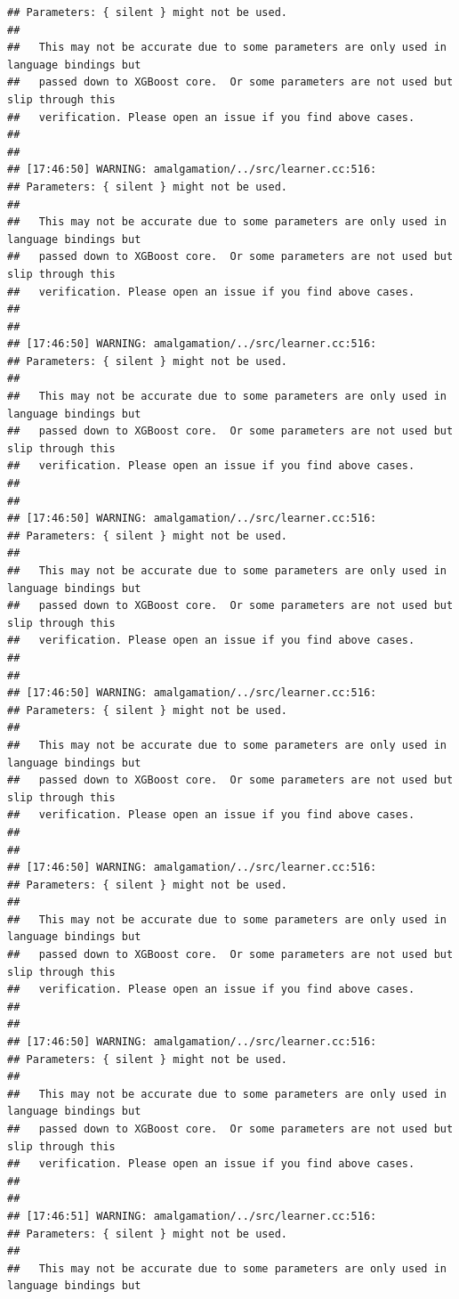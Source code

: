 \documentclass[AMS,STIX2COL]{WileyNJD-v2}\usepackage[]{graphicx}\usepackage[]{color}
\makeatletter
\newenvironment{kframe}{%
 \def\at@end@of@kframe{}%
 \ifinner\ifhmode%
  \def\at@end@of@kframe{\end{minipage}}%
  \begin{minipage}{\columnwidth}%
 \fi\fi%
 \def\FrameCommand##1{\hskip\@totalleftmargin \hskip-\fboxsep
 \colorbox{shadecolor}{##1}\hskip-\fboxsep
     \hskip-\linewidth \hskip-\@totalleftmargin \hskip\columnwidth}%
 \MakeFramed {\advance\hsize-\width
   \@totalleftmargin\z@ \linewidth\hsize
   \@setminipage}}%
 {\par\unskip\endMakeFramed%
 \at@end@of@kframe}
\newenvironment{knitrout}{}{} %
\makeatother
\begin{document}
\begin{knitrout}
\begin{kframe}
\begin{verbatim}
## Parameters: { silent } might not be used.
## 
##   This may not be accurate due to some parameters are only used in language bindings but
##   passed down to XGBoost core.  Or some parameters are not used but slip through this
##   verification. Please open an issue if you find above cases.
## 
## 
## [17:46:50] WARNING: amalgamation/../src/learner.cc:516: 
## Parameters: { silent } might not be used.
## 
##   This may not be accurate due to some parameters are only used in language bindings but
##   passed down to XGBoost core.  Or some parameters are not used but slip through this
##   verification. Please open an issue if you find above cases.
## 
## 
## [17:46:50] WARNING: amalgamation/../src/learner.cc:516: 
## Parameters: { silent } might not be used.
## 
##   This may not be accurate due to some parameters are only used in language bindings but
##   passed down to XGBoost core.  Or some parameters are not used but slip through this
##   verification. Please open an issue if you find above cases.
## 
## 
## [17:46:50] WARNING: amalgamation/../src/learner.cc:516: 
## Parameters: { silent } might not be used.
## 
##   This may not be accurate due to some parameters are only used in language bindings but
##   passed down to XGBoost core.  Or some parameters are not used but slip through this
##   verification. Please open an issue if you find above cases.
## 
## 
## [17:46:50] WARNING: amalgamation/../src/learner.cc:516: 
## Parameters: { silent } might not be used.
## 
##   This may not be accurate due to some parameters are only used in language bindings but
##   passed down to XGBoost core.  Or some parameters are not used but slip through this
##   verification. Please open an issue if you find above cases.
## 
## 
## [17:46:50] WARNING: amalgamation/../src/learner.cc:516: 
## Parameters: { silent } might not be used.
## 
##   This may not be accurate due to some parameters are only used in language bindings but
##   passed down to XGBoost core.  Or some parameters are not used but slip through this
##   verification. Please open an issue if you find above cases.
## 
## 
## [17:46:50] WARNING: amalgamation/../src/learner.cc:516: 
## Parameters: { silent } might not be used.
## 
##   This may not be accurate due to some parameters are only used in language bindings but
##   passed down to XGBoost core.  Or some parameters are not used but slip through this
##   verification. Please open an issue if you find above cases.
## 
## 
## [17:46:51] WARNING: amalgamation/../src/learner.cc:516: 
## Parameters: { silent } might not be used.
## 
##   This may not be accurate due to some parameters are only used in language bindings but

\end{verbatim}
\end{kframe}
\end{knitrout}
\end{document}
